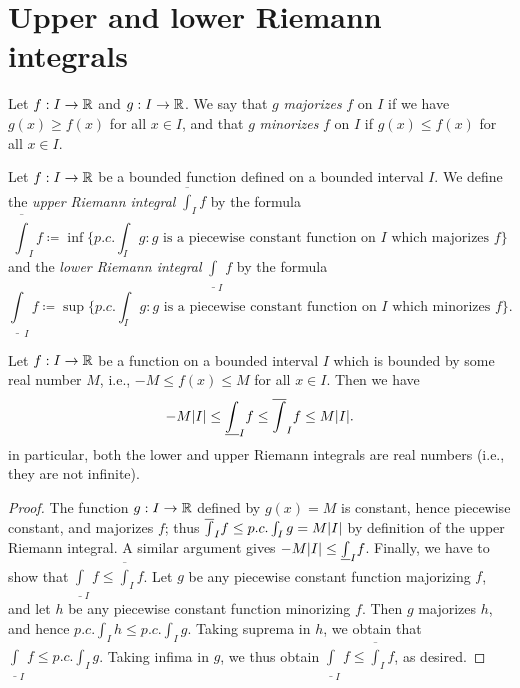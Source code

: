 \section{Upper and lower Riemann integrals}\label{sec:11.3}

\begin{defn}\label{11.3.1}
  Let \(f : I \to \mathbb{R}\) and \(g : I \to \mathbb{R}\).
  We say that \(g\) \emph{majorizes} \(f\) on \(I\) if we have \(g(x) \geq f(x)\) for all \(x \in I\), and that \(g\) \emph{minorizes} \(f\) on \(I\) if \(g(x) \leq f(x)\) for all \(x \in I\).
\end{defn}

\begin{defn}\label{11.3.2}
  Let \(f : I \to \mathbb{R}\) be a bounded function defined on a bounded interval \(I\).
  We define the \emph{upper Riemann integral} \(\overline{\int}_I f\) by the formula
  \[
    \overline{\int}_I f \coloneqq \inf\bigg\{p.c. \int_I g : g \text{ is a piecewise constant function on \(I\) which majorizes } f\bigg\}
  \]
  and the \emph{lower Riemann integral} \(\underline{\int}_I f\) by the formula
  \[
    \underline{\int}_I f \coloneqq \sup\bigg\{p.c. \int_I g : g \text{ is a piecewise constant function on \(I\) which minorizes } f\bigg\}.
  \]
\end{defn}

\begin{lem}\label{11.3.3}
  Let \(f : I \to \mathbb{R}\) be a function on a bounded interval \(I\) which is bounded by some real number \(M\), i.e., \(-M \leq f(x) \leq M\) for all \(x \in I\).
  Then we have
  \[
    -M \abs{I} \leq \underline{\int}_I f \leq \overline{\int}_I f \leq M \abs{I}.
  \]
  in particular, both the lower and upper Riemann integrals are real numbers (i.e., they are not infinite).
\end{lem}

\begin{proof}
  The function \(g : I \to \mathbb{R}\) defined by \(g(x) = M\) is constant, hence piecewise constant, and majorizes \(f\);
  thus \(\overline{\int}_I f \leq p.c. \int_I g = M \abs{I}\) by definition of the upper Riemann integral.
  A similar argument gives \(-M \abs{I} \leq \underline{\int}_I f\).
  Finally, we have to show that \(\underline{\int}_I f \leq \overline{\int}_I f\).
  Let \(g\) be any piecewise constant function majorizing \(f\), and let \(h\) be any piecewise constant function minorizing \(f\).
  Then \(g\) majorizes \(h\), and hence \(p.c. \int_I h \leq p.c. \int_I g\).
  Taking suprema in \(h\), we obtain that \(\underline{\int}_I f \leq p.c. \int_I g\).
  Taking infima in \(g\), we thus obtain \(\underline{\int}_I f \leq \overline{\int}_I f\), as desired.
\end{proof}

